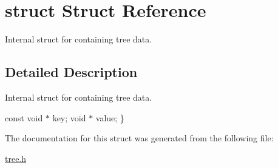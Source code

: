 \hypertarget{structstruct}{}\section{struct Struct Reference}
\label{structstruct}


Internal struct for containing tree data.  




\subsection{Detailed Description}
Internal struct for containing tree data. 

const void $\ast$ key; void $\ast$ value; \} 

The documentation for this struct was generated from the following file\+:\begin{DoxyCompactItemize}
\item 
\hyperlink{tree_8h}{tree.\+h}\end{DoxyCompactItemize}
